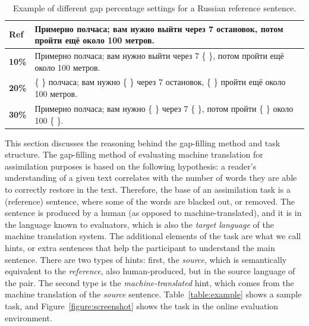 \documentclass[11pt]{article}
\newcommand{\comment}[1]{}
\newcommand{\rus}[1]{\foreignlanguage{russian}{#1}}
\begin{document}
\begin{table}
  \centering
  \begin{tabular}{|l|l|}
     \hline
     \textbf{Ref} & \rus{{\small Примерно полчаса; вам нужно выйти через 7 остановок, потом пройти ещё около 100 метров.}} \\
     \hline
     \textbf{10\%} & \rus{{\small Примерно полчаса; вам нужно выйти через 7 \{ \}, потом пройти ещё около 100 метров.}} \\
     \textbf{20\%} & \rus{{\small \{ \} полчаса; вам нужно \{ \} через 7 остановок, \{ \} пройти ещё около 100 метров.}} \\
     \textbf{30\%} & \rus{{\small Примерно полчаса; вам нужно \{ \} через 7 \{ \}, потом пройти \{ \} около 100 \{ \}.}} \\
     \hline
  \end{tabular}
  \caption{Example of different gap percentage settings for a Russian reference sentence.} 
  \label{table:percentage}
\end{table}
\comment{MLF the gap percentage table 2 is not referenced in the text; also, i have changed it to have the \textbf{Ref} row in the table?}


This section discusses the reasoning behind the gap-filling method and task structure. The gap-filling method 
of evaluating machine translation for assimilation purposes is based on the following hypothesis: a reader's understanding 
of a given text correlates with the number of words they are able to correctly restore in the text. Therefore, the 
base of an assimilation task is a (reference) sentence, where some of the words are blacked out, or removed. The sentence 
is produced by a human (as opposed to machine-translated), and it is in the language known to evaluators, which is also 
the \emph{target language} of the machine translation system.
The additional elements of the task are what we call hints, or extra sentences that help the participant to understand 
the main sentence. There are two types of hints: first, the \emph{source}, which is semantically equivalent to the \emph{reference}, 
also human-produced, but in the source language of the pair. The second type is the \emph{machine-translated} hint, which 
comes from the machine translation of the \emph{source} sentence. Table~\ref{table:example} shows a sample task, and Figure~\ref{figure:screenshot} shows the task in the online evaluation environment.
\end{document}
